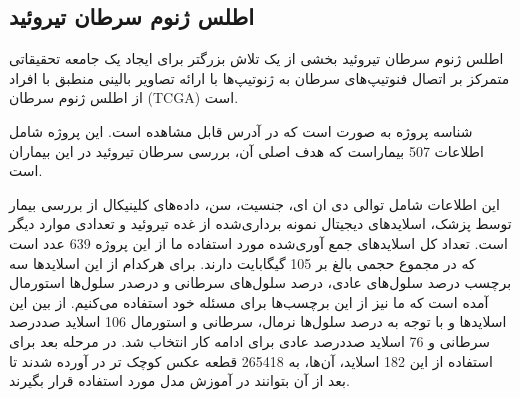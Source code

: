 \subsection{اطلس ژنوم سرطان تیروئید}\label{subsec:موسسه-ملی-سرطان-پورتال-داده-های-مشترک-ژنومیک}

اطلس ژنوم سرطان تیروئید بخشی از یک تلاش بزرگتر برای ایجاد یک جامعه تحقیقاتی متمرکز بر اتصال فنوتیپ‌های سرطان به ژنوتیپ‌ها با ارائه تصاویر بالینی منطبق با افراد از اطلس ژنوم سرطان (TCGA) است.\cite{clark2013cancer}

شناسه پروژه به صورت  است که در آدرس \cite{ncigdc} قابل مشاهده است. این پروژه شامل اطلاعات 507 بیماراست که هدف اصلی آن، بررسی سرطان تیروئید در این بیماران است.

این اطلاعات شامل توالی دی ان ای، جنسیت، سن، داده‌های کلینیکال از بررسی بیمار توسط پزشک، اسلایدهای دیجیتال نمونه برداری‌شده از غده تیروئید و تعدادی موارد دیگر است.
تعداد کل اسلاید‌های جمع آوری‌شده مورد استفاده ما از این پروژه 639 عدد است که در مجموع حجمی بالغ بر 105 گیگابایت دارند. برای هرکدام از این اسلاید‌ها سه برچسب درصد سلول‌های عادی، درصد سلول‌های سرطانی و درصدر سلول‌ها استورمال آمده است که ما نیز از این برچسب‌ها برای مسئله خود استفاده می‌کنیم. از بین این اسلاید‌ها و با توجه به درصد سلول‌ها نرمال، سرطانی و استورمال 106 اسلاید صددرصد سرطانی و 76 اسلاید صددرصد عادی برای ادامه کار انتخاب شد.
در مرحله بعد برای استفاده از این 182 اسلاید، آن‌ها، به 265418 قطعه عکس کوچک تر در آورده شدند تا بعد از آن بتوانند در آموزش مدل مورد استفاده قرار بگیرند.